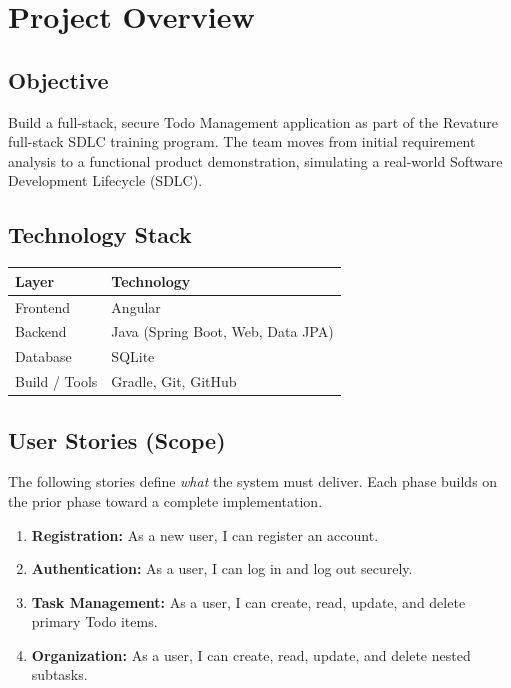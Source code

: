 
\section{Project Overview}\label{sec:overview}

\subsection{Objective}
Build a full-stack, secure Todo Management application as part of the Revature full-stack
SDLC training program. The team moves from initial requirement analysis to a functional
product demonstration, simulating a real-world Software Development Lifecycle (SDLC).

\subsection{Technology Stack}
\begin{tabularx}{\textwidth}{@{} l X @{}}
\toprule
\textbf{Layer} & \textbf{Technology} \\
\midrule
Frontend       & Angular \\
Backend        & Java (Spring Boot, Web, Data JPA) \\
Database       & SQLite \\
Build / Tools  & Gradle, Git, GitHub \\
\bottomrule
\end{tabularx}

\subsection{User Stories (Scope)}
The following stories define \emph{what} the system must deliver. Each phase builds on
the prior phase toward a complete implementation.

\begin{enumerate}
  \item \textbf{Registration:} As a new user, I can register an account.
  \item \textbf{Authentication:} As a user, I can log in and log out securely.
  \item \textbf{Task Management:} As a user, I can create, read, update, and delete primary Todo items.
  \item \textbf{Organization:} As a user, I can create, read, update, and delete nested subtasks.
\end{enumerate}

